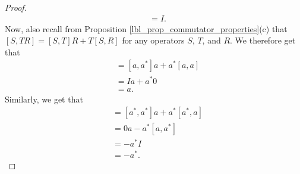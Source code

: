 \begin{proof}
\begin{align*}
    &= I.
  \end{align*}
  Now, also recall from Proposition \eqref{lbl_prop_commutator_properties}(c) that $[S, TR] = [S,T]R + T[S,R]$ for any operators $S$, $T$, and $R$. We therefore get that
  \begin{align*}
    [a, a^* a]
    &= [a, a^*]a + a^*[a, a] \\
    &= Ia + a^* 0 \\
    &= a.
  \end{align*}
  Similarly, we get that
  \begin{align*}
    [a^*, a^* a]
    &= [a^*, a^*]a + a^*[a^*, a] \\
    &= 0 a - a^*[a, a^*] \\
    &= - a^* I \\
    &= - a^*.
  \end{align*}
\end{proof}
